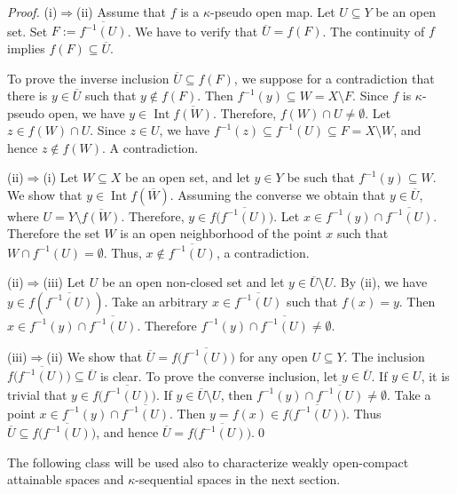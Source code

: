 \documentclass[preprint,11pt]{elsarticle}
\def\cl#1{\overline{#1}}
\def\Int{\operatorname{Int}}
\numberwithin{equation}{section}
\numberwithin{theorem}{section}
\newcommand{\Ra}{\Rightarrow}
\newcommand{\SM}{{\setminus}}
\def\cl#1{\overline{#1}}
\begin{document}
\begin{proof}
(i)$\Ra$(ii)  Assume that $f$ is a $\kappa$-pseudo open map. Let $U\subseteq Y$ be an open set. Set $F:=\overline{f^{-1}(U)}$. We have to verify that $\overline{U}=f(F)$. The continuity of $f$ implies  $f(F) \subseteq \overline{U}$.

To prove the inverse inclusion $\overline{U} \subseteq f(F)$, we suppose for a contradiction that there is $y\in \overline{U}$ such that $y\notin f(F)$. Then $f^{-1}(y)\subseteq W= X\setminus F$. Since $f$ is $\kappa$-pseudo open, we have $y\in \Int \cl{f(W)}$. Therefore, $f(W)\cap U\neq\emptyset$. Let $z\in f(W)\cap U$. Since $z\in U$, we have $f^{-1}(z)\subseteq f^{-1}(U)\subseteq F=X\setminus W$, and hence $z\notin f(W)$. A contradiction.
\smallskip

(ii)$\Ra$(i) Let $W\subseteq X$ be an open set, and let $y\in Y$ be such that $f^{-1}(y)\subseteq W$. We show that $y\in \Int{f(\overline{W})}$. Assuming the converse we obtain that $y\in \overline{U}$, where $U=Y\SM\overline{f(W)}$. Therefore, $y\in f\big(\overline{f^{-1}(U)}\big)$. Let $x\in f^{-1}(y)\cap \overline{f^{-1}(U)}$. Therefore the set $W$ is an open neighborhood of the point $x$ such that  $W\cap f^{-1}(U)=\emptyset$. Thus, $x\notin \overline{f^{-1}(U)}$, a contradiction.

(ii)$\Ra$(iii)  Let $U$ be an open non-closed set and let $y\in \overline{U}\SM U$. By (ii), we have $y\in f(\overline{f^{-1}(U)})$. Take an arbitrary $x\in \overline{f^{-1}(U)}$ such that $f(x)=y$. Then $x\in f^{-1}(y) \cap \overline{f^{-1}(U)}$. Therefore $ f^{-1}(y) \cap \overline{f^{-1}(U)}\neq\emptyset$.
\smallskip

(iii)$\Ra$(ii)  We show that $\overline{U}=f\big(\overline{f^{-1}(U)}\big)$ for any open $U\subseteq Y$. The inclusion $f\big(\overline{f^{-1}(U)}\big)\subseteq \overline{U}$ is clear. To prove the converse inclusion, let $y\in \overline{U}$. If $y\in U$, it is trivial that $y\in f\big(\overline{f^{-1}(U)}\big)$. If $y\in \overline{U}\SM U$, then $f^{-1}(y) \cap \overline{f^{-1}(U)}\neq\emptyset$. Take a point $x\in  f^{-1}(y) \cap \overline{f^{-1}(U)}$. Then $y=f(x)\in f\big(\overline{f^{-1}(U)}\big)$. Thus $\overline{U}\subseteq f\big(\overline{f^{-1}(U)}\big)$, and hence $\overline{U}=f\big(\overline{f^{-1}(U)}\big)$.\qed
\end{proof}




The following class will be used also to characterize weakly open-compact attainable spaces and $\kappa$-sequential spaces in the next section.
\end{document}
